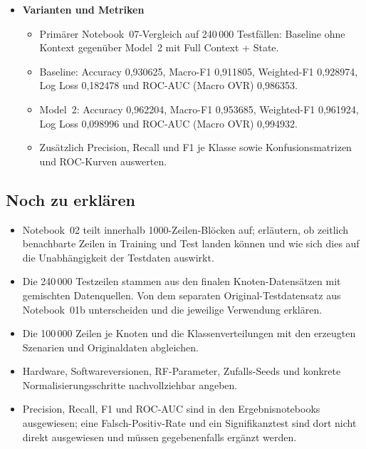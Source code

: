 \begin{itemize}
\begin{itemize}
  \end{itemize}
  \item \textbf{Varianten und Metriken}
  \begin{itemize}
    \item Primärer Notebook~07-Vergleich auf 240\,000 Testfällen:
          Baseline ohne Kontext gegenüber Model~2 mit Full Context + State.
    \item Baseline: Accuracy 0{,}930625, Macro-F1 0{,}911805,
          Weighted-F1 0{,}928974, Log Loss 0{,}182478 und
          ROC-AUC (Macro OVR) 0{,}986353.
    \item Model~2: Accuracy 0{,}962204, Macro-F1 0{,}953685,
          Weighted-F1 0{,}961924, Log Loss 0{,}098996 und
          ROC-AUC (Macro OVR) 0{,}994932.
    \item Zusätzlich Precision, Recall und F1 je Klasse sowie
          Konfusionsmatrizen und ROC-Kurven auswerten.
  \end{itemize}
\end{itemize}

\subsection{Noch zu erklären}
\begin{itemize}
  \item Notebook~02 teilt innerhalb 1000-Zeilen-Blöcken auf; erläutern,
        ob zeitlich benachbarte Zeilen in Training und Test landen können
        und wie sich dies auf die Unabhängigkeit der Testdaten auswirkt.
  \item Die 240\,000 Testzeilen stammen aus den finalen Knoten-Datensätzen
        mit gemischten Datenquellen. Von dem separaten Original-Testdatensatz
        aus Notebook~01b unterscheiden und die jeweilige Verwendung erklären.
  \item Die 100\,000 Zeilen je Knoten und die Klassenverteilungen mit den
        erzeugten Szenarien und Originaldaten abgleichen.
  \item Hardware, Softwareversionen, RF-Parameter, Zufalls-Seeds und
        konkrete Normalisierungsschritte nachvollziehbar angeben.
  \item Precision, Recall, F1 und ROC-AUC sind in den Ergebnisnotebooks
        ausgewiesen; eine Falsch-Positiv-Rate und ein Signifikanztest sind
        dort nicht direkt ausgewiesen und müssen gegebenenfalls ergänzt werden.
\end{itemize}

